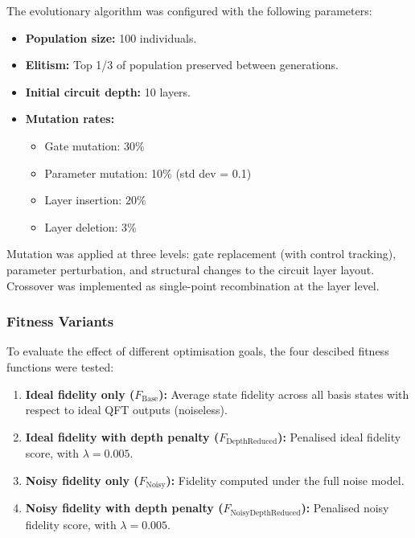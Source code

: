 \documentclass[11pt,a4paper]{article}
\begin{document}
The evolutionary algorithm was configured with the following parameters:

\begin{itemize}
    \item \textbf{Population size:} 100 individuals.
    \item \textbf{Elitism:} Top 1/3 of population preserved between generations.
    \item \textbf{Initial circuit depth:} 10 layers.
    \item \textbf{Mutation rates:}
    \begin{itemize}
        \item Gate mutation: 30\%
        \item Parameter mutation: 10\% (std dev = 0.1)
        \item Layer insertion: 20\%
        \item Layer deletion: 3\%
    \end{itemize}
\end{itemize}

Mutation was applied at three levels: gate replacement (with control tracking), parameter perturbation, and structural changes to the circuit layer layout. Crossover was implemented as single-point recombination at the layer level.

\subsubsection*{Fitness Variants}
To evaluate the effect of different optimisation goals, the four descibed fitness functions were tested:

\begin{enumerate}
    \item \textbf{Ideal fidelity only ($F_{\text{Base}}$):} Average state fidelity across all basis states with respect to ideal QFT outputs (noiseless).
    
    \item \textbf{Ideal fidelity with depth penalty ($F_\text{DepthReduced}$):} Penalised ideal fidelity score, with $\lambda = 0.005$.
    
    \item \textbf{Noisy fidelity only ($F_{\text{Noisy}}$):} Fidelity computed under the full noise model.
    
    \item \textbf{Noisy fidelity with depth penalty ($F_{\text{NoisyDepthReduced}}$):} Penalised noisy fidelity score, with $\lambda = 0.005$.
\end{enumerate}
\end{document}
